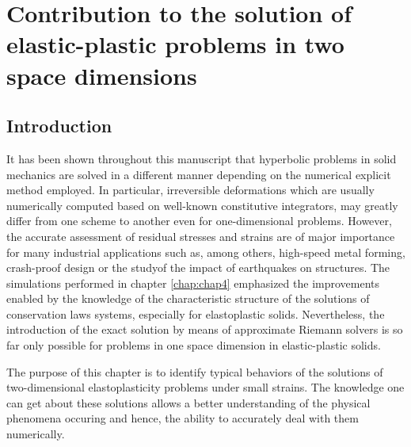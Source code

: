 \chapter{Contribution to the solution of elastic-plastic problems in two space dimensions}

\section*{Introduction}
It has been shown throughout this manuscript that hyperbolic problems in solid mechanics are solved in a different manner depending on the numerical explicit method employed. 
In particular, irreversible deformations which are usually numerically computed based on well-known constitutive integrators, may greatly differ from one scheme to another even for one-dimensional problems.
However, the accurate assessment of residual stresses and strains are of major importance for many industrial applications such as, among others, high-speed metal forming, crash-proof design or the studyof the impact of earthquakes on structures.
The simulations performed in chapter \ref{chap:chap4} emphasized the improvements enabled by the knowledge of the characteristic structure of the solutions of conservation laws systems, especially for elastoplastic solids.
Nevertheless, the introduction of the exact solution by means of approximate Riemann solvers is so far only possible for problems in one space dimension in elastic-plastic solids.

The purpose of this chapter is to identify typical behaviors of the solutions of two-dimensional elastoplasticity problems under small strains.
The knowledge one can get about these solutions allows a better understanding of the physical phenomena occuring and hence, the ability to accurately deal with them numerically.

